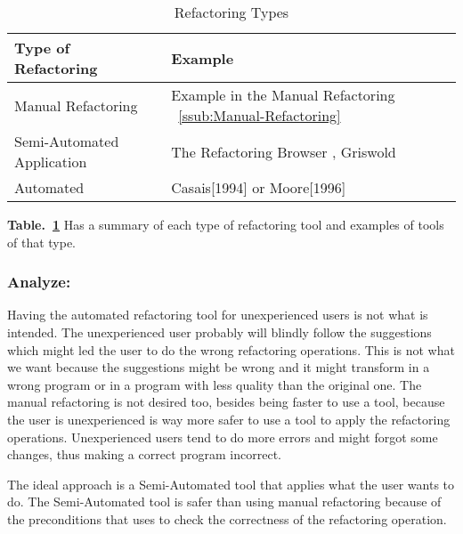 


\begin{table}[h]
\caption{Refactoring Types}
\label{tab-Refactoring-Types}
\begin{tabular}{|l|l|}
\hline
\textbf{Type of Refactoring} & \textbf{Example}                                                                             \\ \hline
Manual Refactoring           & Example in the Manual Refactoring ~\ref{ssub:Manual-Refactoring}      \\ \hline
Semi-Automated Application   & The Refactoring Browser \cite{roberts1997refactoring}, Griswold \cite{griswold1993automated} \\ \hline
Automated                    & Casais[1994] \cite{casais1994automatic} or Moore[1996] \cite{moore1996automatic}             \\ \hline
\end{tabular}
\end{table}



{\bf Table.~\ref{tab-Refactoring-Types}} Has a summary of each type of refactoring tool and examples of tools of that type.

\subsubsection{Analyze:}
Having the automated refactoring tool for unexperienced users is not what is intended. The unexperienced user probably will blindly follow the suggestions which might led the user to do the wrong refactoring operations.
This is not what we want because the suggestions might be wrong and it might transform in a wrong program or in a program with less quality than the original one.
The manual refactoring is not desired too, besides being faster to use a tool, because the user is unexperienced is way more safer to use a tool to apply the refactoring operations. 
Unexperienced users tend to do more errors and might forgot some changes, thus making a correct program incorrect.

The ideal approach is a Semi-Automated tool that applies what the user wants to do. 
The Semi-Automated tool is safer than using manual refactoring because of the preconditions that uses to check the correctness of the refactoring operation.

